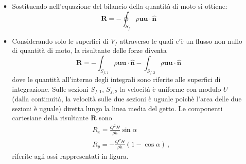 \begin{itemize}

\item Sostituendo nell'equazione del bilancio della quantità di moto si ottiene:
\begin{equation}
  \bm{R} = - \oint_{S_f} \rho \bm{u} \bm{u} \cdot \hat{\bm{n}} 
\end{equation}

\item Considerando solo le superfici di $V_f$ attraverso le quali c'è un flusso non nullo di quantità di moto, la risultante delle forze diventa
\begin{equation}
 \bm{R} = - \int_{S_{f,1}} \rho \bm{u} \bm{u} \cdot \hat{\bm{n}} 
          - \int_{S_{f,2}} \rho \bm{u} \bm{u} \cdot \hat{\bm{n}} 
\end{equation}
dove le quantità all'interno degli integrali sono riferite alle superfici di integrazione.
Sulle sezioni $S_{f,1}$, $S_{f,2}$ la velocità è uniforme con modulo $U$ (dalla continuità, la velocità sulle due sezioni è uguale poichè l'area delle due sezioni è uguale) diretta lungo la linea media del getto. Le componenti cartesiane della risultante $\bm{R}$ sono  
\begin{equation}
\begin{split}
  & R_x = \frac{Q^2 H}{\rho h} \sin \alpha \\
  & R_y = - \frac{Q^2 H}{\rho h} (1-\cos \alpha) \ ,
\end{split}
\end{equation} 
 riferite agli assi rappresentati in figura.




\end{itemize}
